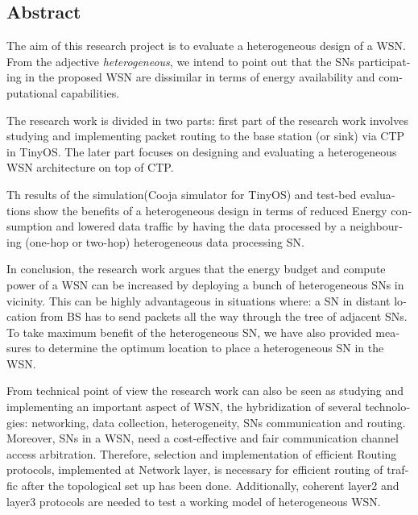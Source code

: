 \begingroup
\let\clearpage\relax
\let\cleardoublepage\relax
\let\cleardoublepage\relax

\begin{otherlanguage}{american}
\chapter*{Abstract}

The aim of this research project is to evaluate a heterogeneous design of a \ac{WSN}. From the adjective \textit{heterogeneous}, we intend to point out that the \acp{SN} participating in the proposed \ac{WSN} are dissimilar in terms of energy availability and computational capabilities.   

\par
The research work is divided in two parts: first part of the research work involves studying and implementing packet routing to the base station (or sink) via \ac{CTP} in TinyOS. The later part focuses on designing and evaluating a heterogeneous \ac{WSN} architecture on top of \ac{CTP}.

\par

Th results of the simulation(Cooja simulator for TinyOS) and test-bed evaluations show the benefits of a heterogeneous design in terms of reduced Energy consumption and lowered data traffic by having the data processed by a neighbouring (one-hop or two-hop) heterogeneous data processing \ac{SN}. 

\par
In conclusion, the research work argues that the energy budget and compute power of a \ac{WSN} can be increased by deploying a bunch of heterogeneous \acp{SN} in vicinity. This can be highly advantageous in situations where: a \ac{SN} in distant location from \ac{BS} has to send packets all the way through the tree of adjacent \acp{SN}. To take maximum benefit of the heterogeneous \ac{SN}, we have also provided measures to determine the optimum location to place a heterogeneous \ac{SN} in the \ac{WSN}.


\par
From technical point of view the research work can also be seen as studying and implementing an important aspect of \ac{WSN}, the hybridization of several technologies: networking, data collection, heterogeneity,  \acp{SN} communication and routing. Moreover, \acp{SN} in a \ac{WSN}, need a cost-effective and fair communication channel access arbitration. Therefore, selection and implementation of efficient Routing protocols, implemented at Network layer, is necessary for efficient routing of traffic after the topological set up has been done. Additionally, coherent layer2 and layer3 protocols are needed to test a working model of heterogeneous \ac{WSN}.
\end{otherlanguage}

\vfill

\endgroup			